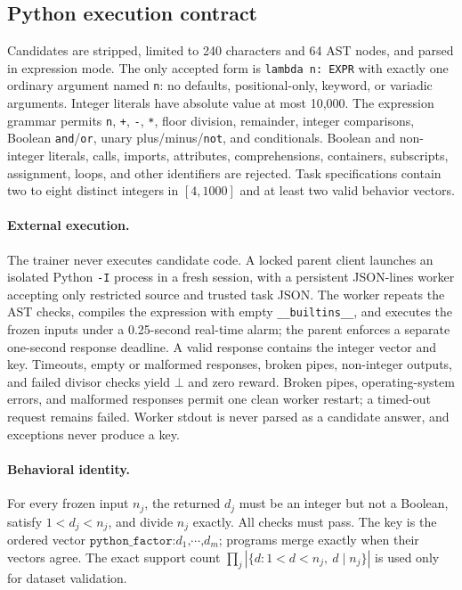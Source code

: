 \documentclass{article}
\newcommand{\1}{\mathbf 1}
\theoremstyle{remark}
\theoremstyle{definition}
\theoremstyle{plain}
\begin{document}
\subsection{Python execution contract}
\label{app:python}
\label{app:python-language}

Candidates are stripped, limited to 240 characters and 64 AST nodes, and
parsed in expression mode. The only accepted form is \texttt{lambda n: EXPR}
with exactly one ordinary argument named \texttt{n}: no defaults,
positional-only, keyword, or variadic arguments. Integer literals have
absolute value at most 10,000. The expression grammar permits \texttt{n},
\texttt{+}, \texttt{-}, \texttt{*}, floor division, remainder, integer
comparisons, Boolean \texttt{and}/\texttt{or}, unary plus/minus/\texttt{not},
and conditionals. Boolean and non-integer literals, calls, imports,
attributes, comprehensions, containers, subscripts, assignment, loops, and
other identifiers are rejected. Task specifications contain two to eight
distinct integers in $[4,1000]$ and at least two valid behavior vectors.

\paragraph{External execution.}
\label{app:python-process}
The trainer never executes candidate code. A locked parent client launches
an isolated Python \texttt{-I} process in a fresh session, with a persistent
JSON-lines worker accepting only restricted source and trusted task JSON.
The worker repeats the AST checks, compiles the expression with empty
\texttt{\_\_builtins\_\_}, and executes the frozen inputs under a
0.25-second real-time alarm; the parent enforces a separate one-second
response deadline. A valid response contains the integer vector and key.
Timeouts, empty or malformed responses, broken pipes, non-integer outputs,
and failed divisor checks yield $\bot$ and zero reward. Broken pipes,
operating-system errors, and malformed responses permit one clean worker
restart; a timed-out request remains failed. Worker stdout is never parsed
as a candidate answer, and exceptions never produce a key.

\paragraph{Behavioral identity.}
\label{app:python-identity}
For every frozen input $n_j$, the returned $d_j$ must be an integer but not a
Boolean, satisfy $1<d_j<n_j$, and divide $n_j$ exactly. All checks must pass.
The key is the ordered vector
$\texttt{python\_factor:}d_1\texttt{,}\cdots\texttt{,}d_m$;
programs merge exactly when their vectors agree. The exact support count
$\prod_j|\{d:1<d<n_j,\ d\mid n_j\}|$ is used only for dataset validation.
\end{document}
